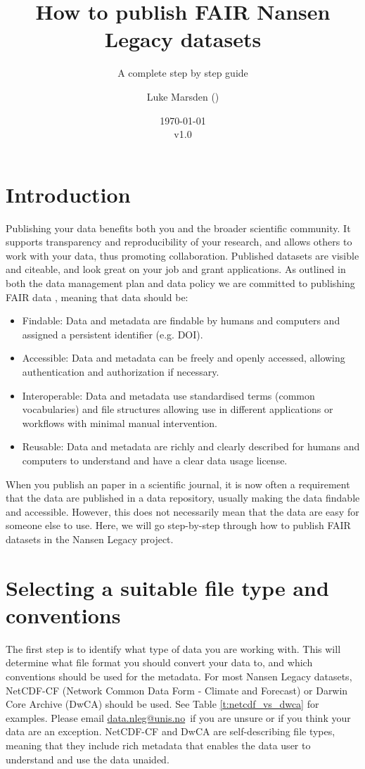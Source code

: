 \documentclass[a4paper,english, 11pt]{article}
\title{How to publish FAIR Nansen Legacy datasets}
\subtitle{A complete step by step guide}
\date{\today\\v1.0}
\author{Luke Marsden (\emailme)}
\makeatletter
\newcommand{\emailme}{\href{mailto:data.nleg@unis.no}{data.nleg@unis.no}}
\makeatother
\begin{document}
\maketitle
\tableofcontents
\pagestyle{fancy}
\newpage
\section{Introduction}
\label{s:Introduction}

Publishing your data benefits both you and the broader scientific community. It supports transparency and reproducibility of your research, and allows others to work with your data, thus promoting collaboration. Published datasets are visible and citeable, and look great on your job and grant applications. As outlined in both the data management plan \citep{aendmp2021} and data policy \citep{aendatapolicy2021} we are committed to publishing FAIR data \citep{wilkinson2016fair}, meaning that data should be:

\begin{itemize}
\item Findable: Data and metadata are findable by humans and computers and assigned a persistent identifier (e.g. DOI).
\item Accessible: Data and metadata can be freely and openly accessed, allowing authentication and authorization if necessary.
\item Interoperable: Data and metadata use standardised terms (common vocabularies) and file structures allowing use in different applications or workflows with minimal manual intervention. 
\item Reusable: Data and metadata are richly and clearly described for humans and computers to understand and have a clear data usage license. 
\end{itemize}

When you publish an paper in a scientific journal, it is now often a requirement that the data are published in a data repository, usually making the data findable and accessible. However, this does not necessarily mean that the data are easy for someone else to use. Here, we will go step-by-step through how to publish FAIR datasets in the Nansen Legacy project.

\section{Selecting a suitable file type and conventions}
\label{s:FileType}

The first step is to identify what type of data you are working with. This will determine what file format you should convert your data to, and which conventions should be used for the metadata. For most Nansen Legacy datasets, NetCDF-CF (Network Common Data Form - Climate and Forecast) or Darwin Core Archive (DwCA) should be used. See Table \ref{t:netcdf_vs_dwca} for examples. Please email \emailme \ if you are unsure or if you think your data are an exception. NetCDF-CF and DwCA are self-describing file types, meaning that they include rich metadata that enables the data user to understand and use the data unaided.
\end{document}
